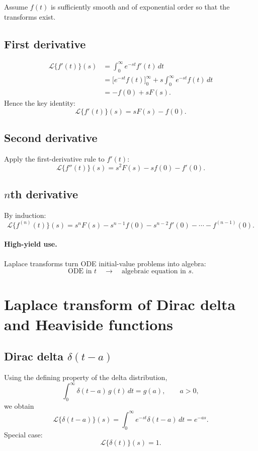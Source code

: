 Assume $f(t)$ is sufficiently smooth and of exponential order so that the transforms exist.

\subsection{First derivative}
\begin{align}
\mathcal{L}\{f'(t)\}(s)
&= \int_0^\infty e^{-st} f'(t)\,dt\\
&= \Big[e^{-st}f(t)\Big]_{0}^{\infty}
+ s\int_0^\infty e^{-st}f(t)\,dt\\
&= -f(0) + sF(s).
\end{align}
Hence the key identity:
\begin{equation}
\boxed{\mathcal{L}\{f'(t)\}(s)=sF(s)-f(0).}
\end{equation}

\subsection{Second derivative}
Apply the first-derivative rule to $f'(t)$:
\begin{equation}
\boxed{\mathcal{L}\{f''(t)\}(s)=s^2F(s)-sf(0)-f'(0).}
\end{equation}

\subsection{$n$th derivative}
By induction:
\begin{equation}
\boxed{
\mathcal{L}\{f^{(n)}(t)\}(s)
=
s^nF(s)-s^{n-1}f(0)-s^{n-2}f'(0)-\cdots-f^{(n-1)}(0).
}
\end{equation}

\paragraph{High-yield use.}
Laplace transforms turn ODE initial-value problems into algebra:
\[
\text{ODE in }t \quad \longrightarrow \quad \text{algebraic equation in }s.
\]


\section{Laplace transform of Dirac delta and Heaviside functions}

\subsection{Dirac delta $\delta(t-a)$}
Using the defining property of the delta distribution,
\[
\int_0^\infty \delta(t-a)\,g(t)\,dt = g(a), \qquad a>0,
\]
we obtain
\begin{equation}
\boxed{
\mathcal{L}\{\delta(t-a)\}(s)
=
\int_0^\infty e^{-st}\delta(t-a)\,dt
=
e^{-as}.
}
\end{equation}
Special case:
\begin{equation}
\mathcal{L}\{\delta(t)\}(s)=1.
\end{equation}

